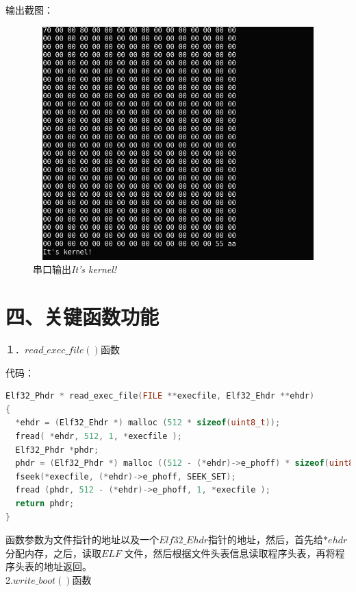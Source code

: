\documentclass[UTF8,noindent]{ctexart}
\begin{document}
输出截图：
\begin{figure}[H]
	\centering\includegraphics[height = 9cm, width = 
	13cm]{fig/4.2.png}\caption{串口输出\emph{It's kernel!}}
\end{figure}

\section*{四、关键函数功能}
１．$read\_exec\_file()$函数

代码：
\begin{lstlisting}[language=c]
Elf32_Phdr * read_exec_file(FILE **execfile, Elf32_Ehdr **ehdr)
{
  *ehdr = (Elf32_Ehdr *) malloc (512 * sizeof(uint8_t));
  fread( *ehdr, 512, 1, *execfile );
  Elf32_Phdr *phdr;
  phdr = (Elf32_Phdr *) malloc ((512 - (*ehdr)->e_phoff) * sizeof(uint8_t));
  fseek(*execfile, (*ehdr)->e_phoff, SEEK_SET);
  fread (phdr, 512 - (*ehdr)->e_phoff, 1, *execfile );
  return phdr;
}
\end{lstlisting}
函数参数为文件指针的地址以及一个$Elf32\_Ehdr$指针的地址，然后，首先给$*ehdr$分配内存，之后，读取$ELF$
文件，然后根据文件头表信息读取程序头表，再将程序头表的地址返回。\\

2.$write\_boot()$函数
\end{document}
